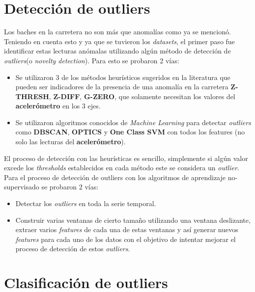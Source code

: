 \section{Detección de outliers}
	Los baches en la carretera no son más que anomalías como ya se mencionó. Teniendo en cuenta esto y ya que se tuvieron 
	los \emph{datasets}, el primer paso fue identificar estas lecturas anómalas utilizando algún método de detección de
	\emph{outliers}(o \emph{novelty detection}). Para esto se probaron 2 vías:\\

	\begin{itemize}
		\item Se utilizaron 3 de los métodos heurísticos sugeridos en la literatura que pueden ser indicadores de la presencia de una
			anomalía en la carretera \textbf{Z-THRESH}, \textbf{Z-DIFF}, \textbf{G-ZERO}, que solamente necesitan los valores
			del \textbf{acelerómetro} en los 3 ejes.
		\item Se utilizaron algoritmos conocidos de \emph{Machine Learning} para detectar \emph{outliers} como \textbf{DBSCAN},
			\textbf{OPTICS} y \textbf{One Class SVM} con todos los features (no solo las lecturas del \textbf{acelerómetro}).
	\end{itemize}

	El proceso de detección con las heurísticas es sencillo, simplemente si algún valor excede los \emph{thresholds} establecidos en 
	cada método este se considera un \emph{outlier}. Para el proceso de detección de outliers con los algoritmos de aprendizaje no-supervisado
	se probaron 2 vías: 

	\begin{itemize}
		\item Detectar los \emph{outliers} en toda la serie temporal.\\
		\item Construir varias ventanas de cierto tamaño utilizando una ventana deslizante, extraer varios \emph{features} de
			cada una de estas ventanas y así generar nuevos \emph {features} para cada uno de los datos con el objetivo de
			intentar mejorar el proceso de detección de estos \emph{outliers}.\\
	\end{itemize}
	

\section{Clasificación de outliers}



